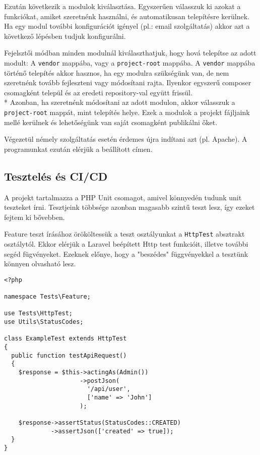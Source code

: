 \documentclass[a4paper,12pt]{thesis-ekf}
\theoremstyle{definition}
\begin{document}
		Ezután következik a modulok kiválasztása. Egyszerűen válasszuk ki azokat a funkciókat, amiket szeretnénk használni, és automatikusan telepítésre kerülnek. Ha egy modul további konfigurációt igényel (pl.: email szolgáltatás) akkor azt a következő lépésben tudjuk konfigurálni.
		
		Fejelsztői módban minden modulnál kiválaszthatjuk, hogy hová telepítse az adott modult: A \verb|vendor| mappába, vagy a \verb|project-root| mappába. A \verb|vendor| mappába történő telepítés akkor hasznos, ha egy modulra szükségünk van, de nem szeretnénk tovább fejleszteni vagy módosítani rajta. Ilyenkor egyszerű composer csomagként települ és az eredeti repository-val együtt frissül.\\*
		Azonban, ha szeretnénk módosítani az adott modulon, akkor válasszuk a \verb|project-root| mappát, mint telepítés helye. Ezek a modulok a projekt fájljaink mellé kerülnek és lehetőségünk van saját csomagként publikálni őket.
		
		Végezetül némely szolgáltatás esetén érdemes újra indítani azt (pl. Apache). A programunkat ezután elérjük a beállított címen.
		
		\subsection{Tesztelés és CI/CD}\label{ssc-CiCd}	
		A projekt tartalmazza a PHP Unit csomagot, amivel könnyedén tudunk unit teszteket írni. Tesztjeink többsége azonban magasabb szintű teszt lesz, így ezeket fejtem ki bővebben.
		
		Feature teszt írásához örököltessük a teszt osztályunkat a \verb|HttpTest| absztrakt osztálytól. Ekkor elérjük a Laravel beépített Http test funkcióit, illetve további segéd fügvényeket. Ezeknek előnye, hogy a "beszédes" függvényekkel a tesztünk könnyen olvasható lesz.
		
\begin{lstlisting}
<?php

namespace Tests\Feature;

use Tests\HttpTest;
use Utils\StatusCodes;

class ExampleTest extends HttpTest
{
  public function testApiRequest()
  {
    $response = $this->actingAs(Admin())
                     ->postJson(
                       '/api/user',
                       ['name' => 'John']
                     );

    $response->assertStatus(StatusCodes::CREATED)
             ->assertJson(['created' => true]);
  }
}
\end{lstlisting}
\end{document}
